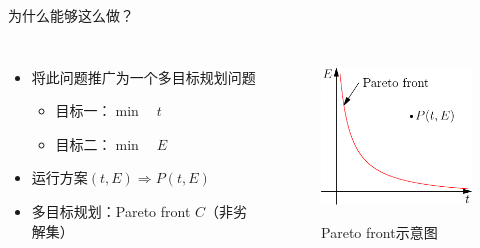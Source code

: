 \documentclass{beamer}
\begin{document}
\begin{frame}{为什么能够这么做？}
    \begin{columns}[c]
        \column{8cm}
            \begin{itemize}
              \item 将此问题推广为一个多目标规划问题
                \begin{itemize}
                  \item 目标一：$\min \quad t$
                  \item 目标二：$\min \quad E$
                \end{itemize}
              \item 运行方案$(t,E) \Longrightarrow  P(t,E)$
              \item 多目标规划：Pareto front $C$（非劣解集）
            \end{itemize}
        \column{5cm}
            \begin{figure}
              \centering
              \includegraphics[width=4.5cm]{fig/fig1/fig1.pdf}\\
              \caption{Pareto front示意图}
            \end{figure}

    \end{columns}
\end{frame}
\end{document}
